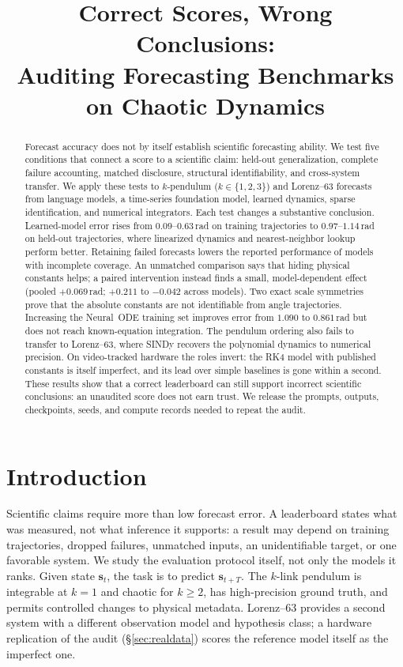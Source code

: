 \documentclass{article}
\title{Correct Scores, Wrong Conclusions:\\
Auditing Forecasting Benchmarks on Chaotic Dynamics}
\author{}
\begin{document}
\maketitle

\begin{abstract}
Forecast accuracy does not by itself establish scientific forecasting ability. We test five
conditions that connect a score to a scientific claim: held-out generalization, complete
failure accounting, matched disclosure, structural identifiability, and cross-system
transfer. We apply these tests to $k$-pendulum ($k\in\{1,2,3\}$) and Lorenz--63 forecasts from
language models, a time-series foundation model, learned dynamics, sparse identification, and
numerical integrators. Each test changes a substantive conclusion. Learned-model error rises
from $0.09$--$0.63$\,rad on training trajectories to $0.97$--$1.14$\,rad on held-out
trajectories, where linearized dynamics and nearest-neighbor lookup perform better. Retaining
failed forecasts lowers the reported performance of models with incomplete coverage. An
unmatched comparison says that hiding physical constants helps; a paired intervention instead
finds a small, model-dependent effect (pooled $+0.069$\,rad; $+0.211$ to $-0.042$ across models). Two exact scale symmetries prove that the absolute constants are
not identifiable from angle trajectories. Increasing the Neural~ODE training set improves
error from $1.090$ to $0.861$\,rad but does not reach known-equation integration. The pendulum
ordering also fails to transfer to Lorenz--63, where SINDy recovers the polynomial dynamics to
numerical precision. On video-tracked hardware the roles invert: the RK4 model with published
constants is itself imperfect, and its lead over simple baselines is gone within a second.
These results show that a correct leaderboard can still support incorrect
scientific conclusions: an unaudited score does not earn trust. We release the prompts,
outputs, checkpoints, seeds, and compute records needed to repeat the audit.
\end{abstract}

\section{Introduction}
Scientific claims require more than low forecast error. A leaderboard states what was
measured, not what inference it supports: a result may depend on training trajectories,
dropped failures, unmatched inputs, an unidentifiable target, or one favorable system. We
study the evaluation protocol itself, not only the models it ranks. Given state $\mathbf{s}_t$, the task is to
predict $\mathbf{s}_{t+T}$. The $k$-link pendulum is integrable at $k{=}1$ and chaotic for
$k{\ge}2$, has high-precision ground truth, and permits controlled changes to physical
metadata. Lorenz--63 provides a second system with a different observation model and
hypothesis class; a hardware replication of the audit (\S\ref{sec:realdata}) scores the
reference model itself as the imperfect one.
\end{document}
